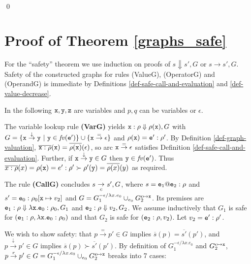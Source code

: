 \documentclass{LMCS}
\newcommand{\vair}{\relax}
\newcommand{\bprf}{\proof}
\newcommand{\eprf}{\qed}
\theoremstyle{definition}\newtheorem{env}[thm]{Environment}
\newcommand{\tosub}[1]{\raisebox{-6.0pt}{$\ \stackrel{\textstyle\to}{\vrule height4.5 pt width0 pt
    depth2.5 pt \smash{\scriptstyle#1}}\ $}}
\begin{document}
\eprf



\section{Proof of Theorem \ref{graphs_safe}}



\bprf 
For the 
``safety'' theorem we use induction on proofs of 
$s\Downarrow s', G$ or
$s\to s', G$. 
Safety of the constructed graphs  for 
rules (ValueG), (OperatorG) and (OperandG)
is immediate by Definitions \ref{def-safe-call-and-evaluation}  
and \ref{def-value-decrease}. 
\vair

In the following ${\tt x, y, z}$ are variables and $p,q$ can be variables or $\epsilon$.



\vair
The variable lookup rule {\bf (VarG)} yields
${\tt x}:\rho\Downarrow \rho({\tt x}),G$ with
$G= \{ {\tt x}\stackrel{\downarrow}{\to}{\tt y}
         \ |\ {\tt y} \in {\it fv}({\tt e}')\}\cup
\{{\tt x}\stackrel{=}{\to}\epsilon\}$ and
$\rho({\tt x}) = {\tt e}':\rho'$. 
By Definition \ref{def-graph-valuation},
$\overline{{\tt x}:\rho}({\tt x}) 
  = \overline{\rho({\tt x})}(\epsilon)$,
  so arc ${\tt x}\stackrel{=}{\to}\epsilon$   satisfies 
Definition \ref{def-safe-call-and-evaluation}. 
Further, if 
${\tt x}\stackrel{\downarrow}{\to}{\tt y}\in G$ then
${\tt y} \in {\it fv}({\tt e}')$. 
Thus 
$\overline{x:\rho}(x) =\rho({\tt x})= e':\rho'\succ\rho'({\tt y})=\overline{\rho(x)}(y)$ as required.

\vair
The rule  {\bf (CallG)} concludes $s\tosub{c}s', G$, where
$s = {\tt e}_1{\tt@e}_2:\rho$ and 
$s' = {\tt e}_0:\rho_0[{\tt x}\mapsto v_2]$ and
$G=G_1^{-\epsilon/\lambda x.e_0}\cup_{e_0} G^{\epsilon\mapsto{\tt x}}_2$. Its
premises are
${\tt e}_1:\rho\Downarrow\lambda{\tt x.e}_0:\rho_0,G_1$ and
${\tt e}_2:\rho\Downarrow v_2,G_2$. 
We assume inductively that  $G_1$ is safe for
$({\tt e}_1:\rho,\lambda{\tt x.e}_0:\rho_0)$ and that
$G_2$ is safe for $({\tt e}_2:\rho, v_2)$. Let $v_2 = {\tt e}':\rho'$.


We wish to show safety: that 
$p\stackrel{=}{\to}p'\in G$ implies 
$\overline{s}(p) = \overline{s'}(p')$, and  
$p\stackrel{\downarrow}{\to}p'\in G$ implies 
$\overline{s}(p) \succ \overline{s'}(p')$.
By definition of $G_1^{-\epsilon/\lambda x.e_0}$ and $G^{\epsilon\mapsto{\tt x}}_2$,  
$p\stackrel{r}{\to}p'\in 
   G=G_1^{-\epsilon/\lambda x.e_0}\cup_{e_0} G^{\epsilon\mapsto{\tt x}}_2$
breaks into 7 cases:
\end{document}
